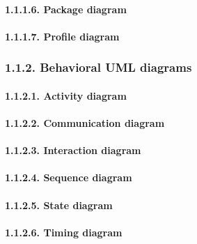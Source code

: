 \documentclass[
]{article}
\begin{document}
\hypertarget{package-diagram}{%
\paragraph{1.1.1.6. Package diagram}\label{package-diagram}}

\hypertarget{profile-diagram}{%
\paragraph{1.1.1.7. Profile diagram}\label{profile-diagram}}

\hypertarget{behavioral-uml-diagrams}{%
\subsubsection{1.1.2. Behavioral UML
diagrams}\label{behavioral-uml-diagrams}}

\hypertarget{activity-diagram}{%
\paragraph{1.1.2.1. Activity diagram}\label{activity-diagram}}

\hypertarget{communication-diagram}{%
\paragraph{1.1.2.2. Communication diagram}\label{communication-diagram}}

\hypertarget{interaction-diagram}{%
\paragraph{1.1.2.3. Interaction diagram}\label{interaction-diagram}}

\hypertarget{sequence-diagram}{%
\paragraph{1.1.2.4. Sequence diagram}\label{sequence-diagram}}

\hypertarget{state-diagram}{%
\paragraph{1.1.2.5. State diagram}\label{state-diagram}}

\hypertarget{timing-diagram}{%
\paragraph{1.1.2.6. Timing diagram}\label{timing-diagram}}
\end{document}
